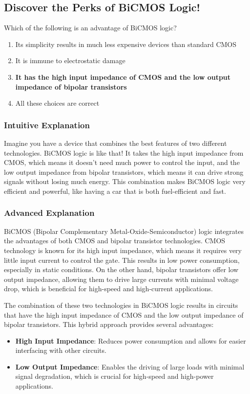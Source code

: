 \subsection{Discover the Perks of BiCMOS Logic!}

\begin{tcolorbox}[colback=gray!10!white,colframe=black!75!black,title=E6C04] Which of the following is an advantage of BiCMOS logic?
    \begin{enumerate}[label=\Alph*)]
        \item Its simplicity results in much less expensive devices than standard CMOS
        \item It is immune to electrostatic damage
        \item \textbf{It has the high input impedance of CMOS and the low output impedance of bipolar transistors}
        \item All these choices are correct
    \end{enumerate}
\end{tcolorbox}

\subsubsection{Intuitive Explanation}
Imagine you have a device that combines the best features of two different technologies. BiCMOS logic is like that! It takes the high input impedance from CMOS, which means it doesn't need much power to control the input, and the low output impedance from bipolar transistors, which means it can drive strong signals without losing much energy. This combination makes BiCMOS logic very efficient and powerful, like having a car that is both fuel-efficient and fast.

\subsubsection{Advanced Explanation}
BiCMOS (Bipolar Complementary Metal-Oxide-Semiconductor) logic integrates the advantages of both CMOS and bipolar transistor technologies. CMOS technology is known for its high input impedance, which means it requires very little input current to control the gate. This results in low power consumption, especially in static conditions. On the other hand, bipolar transistors offer low output impedance, allowing them to drive large currents with minimal voltage drop, which is beneficial for high-speed and high-current applications.

The combination of these two technologies in BiCMOS logic results in circuits that have the high input impedance of CMOS and the low output impedance of bipolar transistors. This hybrid approach provides several advantages:
\begin{itemize}
    \item \textbf{High Input Impedance}: Reduces power consumption and allows for easier interfacing with other circuits.
    \item \textbf{Low Output Impedance}: Enables the driving of large loads with minimal signal degradation, which is crucial for high-speed and high-power applications.
\end{itemize}

